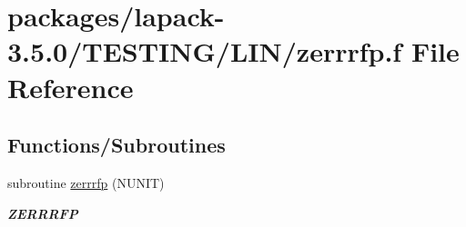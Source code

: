 \hypertarget{zerrrfp_8f}{}\section{packages/lapack-\/3.5.0/\+T\+E\+S\+T\+I\+N\+G/\+L\+I\+N/zerrrfp.f File Reference}
\label{zerrrfp_8f}
\subsection*{Functions/\+Subroutines}
\begin{DoxyCompactItemize}
\item 
subroutine \hyperlink{group__complex16__lin_ga28c5999b94bcb2329f73db89500dc07f}{zerrrfp} (N\+U\+N\+I\+T)
\begin{DoxyCompactList}\small\item\em {\bfseries Z\+E\+R\+R\+R\+F\+P} \end{DoxyCompactList}\end{DoxyCompactItemize}
